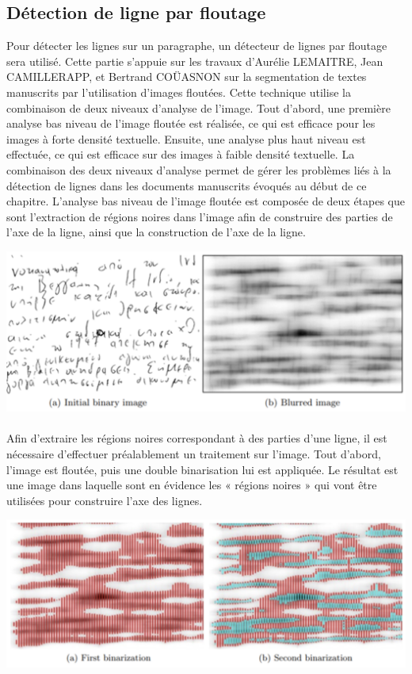 \subsection{Détection de ligne par floutage}

Pour détecter les lignes sur un paragraphe, un détecteur de lignes par floutage sera utilisé. Cette partie s'appuie sur les
travaux d'Aurélie LEMAITRE, Jean CAMILLERAPP, et Bertrand COÜASNON sur la segmentation de textes manuscrits par l’utilisation
d’images floutées. Cette technique utilise la combinaison de deux niveaux d'analyse de l'image. Tout d'abord, une première
analyse bas niveau de l'image floutée est réalisée, ce qui est efficace pour les images à forte densité textuelle. Ensuite,
une analyse plus haut niveau est effectuée, ce qui est efficace sur des images à faible densité textuelle. La combinaison des
deux niveaux d'analyse permet de gérer les problèmes liés à la détection de lignes dans les documents manuscrits évoqués au
début de ce chapitre. L'analyse bas niveau de l'image floutée est composée de deux étapes que sont l'extraction de régions
noires dans l'image afin de construire des parties de l'axe de la ligne, ainsi que la construction de l'axe de la ligne.

\begin{mdframed}[frametitle={Figure 11 : Floutage d'une image}, innerbottommargin=10]
\begin{center}
\includegraphics[width=0.6\linewidth]{detect1.png}
\end{center}
\end{mdframed}

\paragraph{}
Afin d'extraire les régions noires correspondant à des parties d'une ligne, il est nécessaire d'effectuer préalablement un
traitement sur l'image. Tout d'abord, l'image est floutée, puis une double binarisation lui est appliquée. Le résultat est
une image dans laquelle sont en évidence les « régions noires » qui vont être utilisées pour construire l'axe des lignes.

\begin{mdframed}[frametitle={Figure 12 : Binarisation d'une image}, innerbottommargin=10]
\begin{center}
\includegraphics[width=0.6\linewidth]{detect2.png}
\end{center}
\end{mdframed}

